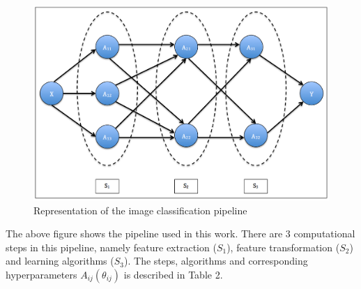 \begin{figure}[H]
\label{image_pipeline}
    \centering
    \includegraphics[scale=0.4]{img/EP/pipeline}
    \caption{Representation of the image classification pipeline}
\end{figure}
 The above figure shows the pipeline used in this work. There are 3 computational steps in this pipeline, namely feature extraction ($S_1$), feature transformation ($S_2$) and learning algorithms ($S_3$). The steps, algorithms and corresponding hyperparameters $A_{ij}(\theta_{ij})$ is described in Table 2.

